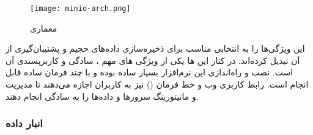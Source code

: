 \begin{figure}[t]
	\centering
	\texttt{[image: minio-arch.png]}
	\caption{معماری }
	\label{fig: minio arch}
\end{figure}

این ویژگی‌ها  را به انتخابی مناسب برای ذخیره‌سازی داده‌های حجیم و پشتیبان‌گیری از آن تبدیل کرده‌اند. در کنار این ها یکی از ویژگی های مهم ، سادگی و کاربرپسندی آن است. نصب و راه‌اندازی این نرم‌افزار بسیار ساده بوده و با چند فرمان ساده قابل انجام است. رابط کاربری وب و خط فرمان () نیز به کاربران اجازه می‌دهند تا مدیریت و مانیتورینگ سرورها و داده‌ها را به سادگی انجام دهند.


\subsubsection{انبار داده}







